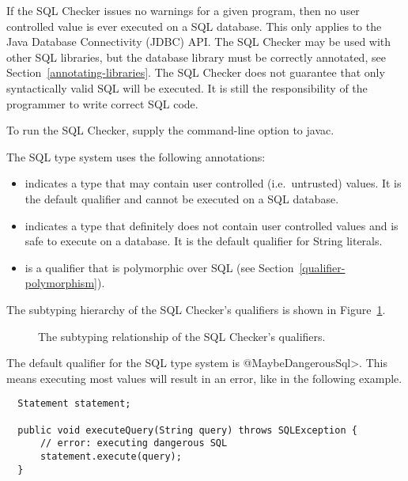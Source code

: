 If the SQL Checker issues no warnings for a given program, then no user
controlled value is ever executed on a SQL database. This only applies to the
Java Database Connectivity (JDBC) API\@. The SQL Checker may be used with other
SQL libraries, but the database library must be correctly annotated, see
Section~\ref{annotating-libraries}. The SQL Checker does not guarantee that only
syntactically valid SQL will be executed. It is still the responsibility of the
programmer to write correct SQL code.

To run the SQL Checker, supply the
command-line option to javac.



The SQL type system uses the following annotations:
\begin{itemize}
\item
   indicates a type that may
  contain user controlled (i.e.\ untrusted) values. It is the default qualifier
  and cannot be executed on a SQL database.
\item
   indicates a type that
  definitely does not contain user controlled values and is safe to execute on
  a database. It is the default qualifier for String literals.
\item
   is a qualifier that is
  polymorphic over SQL (see Section~\ref{qualifier-polymorphism}).
\end{itemize}

The subtyping hierarchy of the SQL Checker's qualifiers is shown in
Figure~\ref{fig-sql-hierarchy}.

\begin{figure}
\caption{The subtyping relationship of the SQL Checker's qualifiers.}
\label{fig-sql-hierarchy}
\end{figure}



The default qualifier for the SQL type system is \<@MaybeDangerousSql>. This
means executing most values will result in an error, like in the following
example.
\begin{Verbatim}
  Statement statement;

  public void executeQuery(String query) throws SQLException {
      // error: executing dangerous SQL
      statement.execute(query);
  }
\end{Verbatim}

